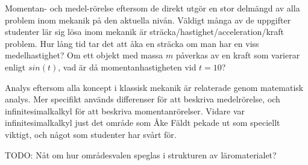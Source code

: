 \begin{binge}
\begin{draft}
  Momentan- och medel-rörelse eftersom de direkt utgör en stor delmängd
  av alla problem inom mekanik på den aktuella nivån. Väldigt många av
  de uppgifter studenter lär sig lösa inom mekanik är
  sträcka/hastighet/acceleration/kraft problem. Hur lång tid tar det att åka en
  sträcka om man har en viss medelhastighet? Om ett objekt med massa $m$
  påverkas av en kraft som varierar enligt $sin(t)$, vad är då
  momentanhastigheten vid $t=10$?

  Analys eftersom alla koncept i klassisk mekanik är relaterade genom
  matematisk analys. Mer specifikt används differenser för att beskriva
  medelrörelse, och infinitesimalkalkyl för att beskriva
  momentanrörelser. Vidare var infinitesimalkalkyl just det område som
  Åke Fäldt pekade ut som speciellt viktigt, och något som studenter har
  svårt för.
\end{draft}

TODO: Nåt om hur områdesvalen speglas i strukturen av läromaterialet?

\end{binge}

